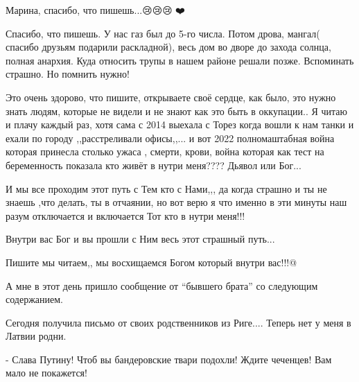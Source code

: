  
 
 
 
 

\qqSecCmt


Марина, спасибо, что пишешь...😢😢😢🙏❤️


Спасибо, что пишешь. У нас газ был до 5-го числа. Потом дрова, мангал( спасибо
друзьям подарили раскладной), весь дом во дворе до захода солнца, полная
анархия. Куда относить трупы в нашем районе решали позже. Вспоминать страшно.
Но помнить нужно!


Это очень здорово, что пишите, открываете своё сердце, как было, это нужно
знать людям, которые не видели и не знают как это быть в оккупации.. Я читаю и
плачу каждый раз, хотя сама с 2014 выехала с Торез когда вошли к нам танки и
ехали по городу ,,расстреливали офисы,,... и вот 2022 полномаштабная война
которая принесла столько ужаса , смерти, крови, война которая как тест на
беременность показала кто живёт в нутри меня???? Дьявол или Бог...

И мы все проходим этот путь с Тем кто с Нами,,, да когда страшно и ты не знаешь
,что делать, ты в отчаянии, но вот верю я что именно в эти минуты наш разум
отключается и включается Тот кто в нутри меня!!!

Внутри вас Бог и вы прошли с Ним весь этот страшный путь...

Пишите мы читаем,, мы восхищаемся Богом который внутри вас!!!@


А мне в этот день пришло сообщение от \enquote{бывшего брата} со следующим
содержанием.

Сегодня получила письмо от своих родственников из Риге.... Теперь нет у меня в
Латвии родни.

- Слава Путину! Чтоб вы бандеровские твари подохли! Ждите чеченцев! Вам мало не
покажется!
